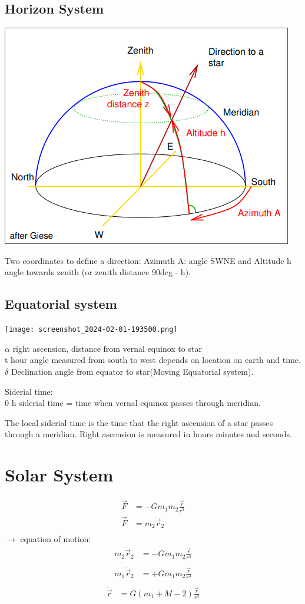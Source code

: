 \documentclass[11pt,a4paper]{article}
\begin{document}
\subsection{Horizon System}
\begin{center}
    \includegraphics[width=0.6\linewidth]{screenshot_2024-01-13-201929.png}
\end{center}
Two coordinates to define a direction:
Azimuth A: angle SWNE and Altitude h angle towards zenith (or zenith distance 90deg - h). 
\subsection{Equatorial system}
\begin{center}
    \texttt{[image: screenshot\_2024-02-01-193500.png]}\\
\end{center}
$\alpha$ right ascension, distance from vernal equinox to star \\ 
t hour angle measured from south to west depends on location on earth and time.
$\delta$ Declination angle from equator to star(Moving Equatorial system). 

Siderial time: \\
0 h siderial time = time
when vernal equinox
passes through meridian.

The local siderial time is the time that the right ascension of a star passes through a meridian. 
Right ascension is measured in hours minutes and seconds. 
\section{Solar System}
\begin{align*}
    \vec F &= -Gm_1m_2 \frac {\vec r } {r^3} \\ 
\vec F &= m_2  \ddot \vec r_2 \\
\end{align*}
$\rightarrow$ equation of motion: 
\begin{align*}
    m_2  \ddot \vec r_2 &= -Gm_1m_2 \frac {\vec r } {r^3} \\
\end{align*}
\begin{align*}
    m_1  \ddot \vec r_2 &= +Gm_1m_2 \frac {\vec r } {r^3} \\
\end{align*}
\begin{align*}
    \ddot \vec r &= G(m_1 + M-2) \frac {\vec r } {r^3}
\end{align*}
\end{document}
